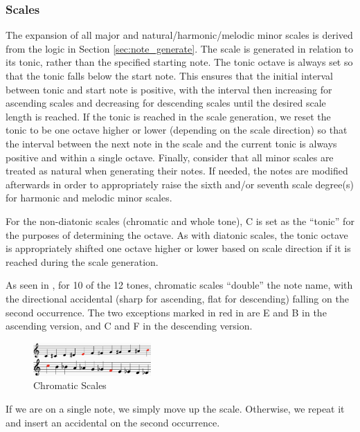 \documentclass{article}
\begin{document}
\subsubsection{Scales}
The expansion of all major and natural/harmonic/melodic minor scales is derived from the logic in Section \ref{sec:note_generate}. The scale is generated in relation to its tonic, rather than the specified starting note. The tonic octave is always set so that the tonic  falls below the start note. This ensures that the initial interval between tonic and start note is positive, with the interval then increasing for ascending scales and decreasing for descending scales until the desired scale length is reached. If the tonic  is reached in the scale generation, we reset the tonic to be one octave higher or lower (depending on the scale direction) so that the interval between the next note in the scale and the current tonic is always positive and within a single octave. Finally, consider that all minor scales are treated as natural when generating their notes. If needed, the notes are modified afterwards in order to appropriately raise the sixth and/or seventh scale degree(s) for harmonic and melodic minor scales. 

For the non-diatonic scales (chromatic and whole tone), C is set as the “tonic” for the purposes of determining the octave. As with diatonic scales, the tonic octave is appropriately shifted one octave higher or lower based on scale direction if it is reached during the scale generation.

As seen in , for 10 of the 12 tones, chromatic scales “double” the note name, with the directional accidental (sharp for ascending, flat for descending) falling on the second occurrence. The two exceptions marked in red in  are E and B in the ascending version, and C and F in the descending version.

\begin{figure}[h!]
\centering
\includegraphics[width=0.4\textwidth]{images/chromatic}
\caption{Chromatic Scales}
\label{chromatic}
\end{figure}

If we are on a single note, we simply move up the scale. Otherwise, we repeat it and insert an accidental on the second occurrence.
\end{document}
